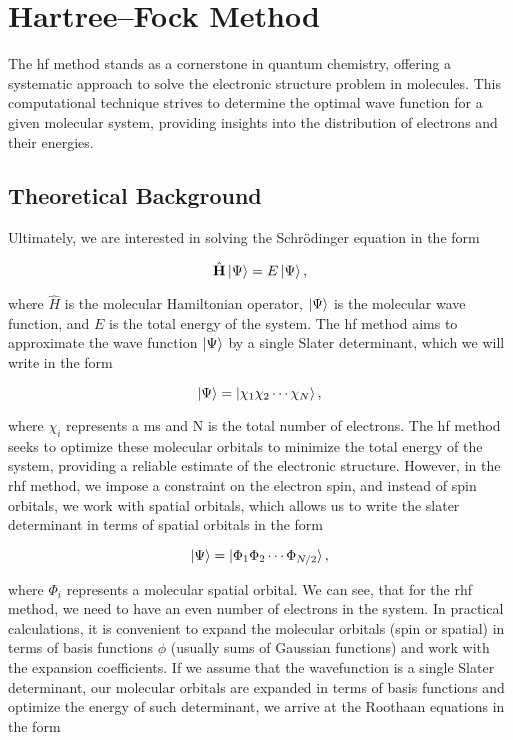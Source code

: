 \chapter{Hartree--Fock Method}

The \acrfull{hf} method stands as a cornerstone in quantum chemistry, offering a systematic approach to solve the electronic structure problem in molecules. This computational technique strives to determine the optimal wave function for a given molecular system, providing insights into the distribution of electrons and their energies.

\section{Theoretical Background}

Ultimately, we are interested in solving the Schrödinger equation in the form

\begin{equation}
\hat{\mathbf{H}}\ket{\Psi}=E\ket{\Psi},
\end{equation}

where \(\hat{H}\) is the molecular Hamiltonian operator, \(\ket{\Psi}\) is the molecular wave function, and \(E\) is the total energy of the system. The \acrshort{hf} method aims to approximate the wave function \(\ket{\Psi}\) by a single Slater determinant, which we will write in the form

\begin{equation}
\ket{\Psi}=\ket{\chi_1\chi_2\cdots\chi_N},
\end{equation}

where \(\chi_i\) represents a \acrfull{ms} and N is the total number of electrons. The \acrshort{hf} method seeks to optimize these molecular orbitals to minimize the total energy of the system, providing a reliable estimate of the electronic structure. However, in the \acrfull{rhf} method, we impose a constraint on the electron spin, and instead of spin orbitals, we work with spatial orbitals, which allows us to write the slater determinant in terms of spatial orbitals in the form

\begin{equation}
\ket{\Psi}=\ket{\Phi_1\Phi_2\cdots\Phi_{N/2}},
\end{equation}

where \(\Phi_i\) represents a molecular spatial orbital. We can see, that for the \acrshort{rhf} method, we need to have an even number of electrons in the system. In practical calculations, it is convenient to expand the molecular orbitals (spin or spatial) in terms of basis functions \(\phi\) (usually sums of Gaussian functions) and work with the expansion coefficients. If we assume that the wavefunction is a single Slater determinant, our molecular orbitals are expanded in terms of basis functions and optimize the energy of such determinant, we arrive at the Roothaan equations in the form

